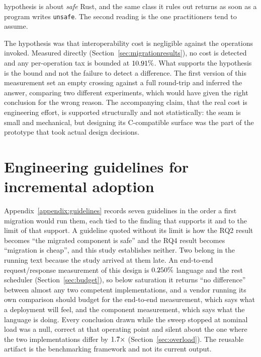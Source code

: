 \documentclass[english,oneside,a4paper,censored,csm,software-track-2020]{HYthesisML}
\begin{document}
\begin{description}
        hypothesis is about \emph{safe} Rust, and the same class it rules out returns as soon as a
        program writes \texttt{unsafe}. The second reading is the one practitioners tend to
        assume.
  \item[H3: supported, and tested the right way on the second attempt.] The hypothesis was
        that interoperability cost is negligible against the operations invoked. Measured
        directly (Section~\ref{sec:migrationresults}), no cost is detected and any per-operation
        tax is bounded at $10.91\%$. What supports the hypothesis is the bound and not
        the failure to detect a difference. The first version of this measurement set an empty
        crossing against a full round-trip and inferred the answer, comparing two different
        experiments, which would have given the right conclusion for the wrong reason. The
        accompanying claim, that the real cost is engineering effort, is supported structurally
        and not statistically: the seam is small and mechanical, but designing its C-compatible
        surface was the part of the prototype that took actual design decisions.
\end{description}

\section{Engineering guidelines for incremental adoption}
\label{sec:guidelines}
Appendix~\ref{appendix:guidelines} records seven guidelines in the order a first migration would
run them, each tied to the finding that supports it and to the limit of that support. A guideline
quoted without its limit is how the RQ2 result becomes ``the migrated component is safe'' and the
RQ4 result becomes ``migration is cheap'', and this study establishes neither. Two belong in the
running text because the study arrived at them late. An end-to-end request/response measurement of
this design is $0.250\%$ language and the rest scheduler
(Section~\ref{sec:budget}), so below saturation it returns ``no difference'' between almost any
two competent implementations, and a vendor running its own comparison should budget for the
end-to-end measurement, which says what a deployment will feel, and the component measurement,
which says what the language is doing. Every conclusion drawn while the sweep stopped at nominal
load was a null, correct at that operating point and silent about the one where the two
implementations differ by $1.7\times$ (Section~\ref{sec:overload}). The reusable
artifact is the benchmarking framework and not its current output.
\end{document}

